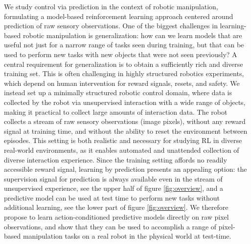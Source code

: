 We study control via prediction in the context of robotic manipulation, formulating a model-based reinforcement learning approach centered around prediction of raw sensory observations. One of the biggest challenges in learning-based robotic manipulation is generalization: how can we learn models that are useful not just for a narrow range of tasks seen during training, but that can be used to perform new tasks with new objects that were not seen previously?
A central requirement for generalization is to obtain a sufficiently rich and diverse training set. This is often challenging in highly structured robotics experiments, which depend on human intervention for reward signals, resets, and safety. We instead set up a minimally structured robotic control domain, where data is collected by the robot via unsupervised interaction with a wide range of objects, making it practical to collect large amounts of interaction data. The robot collects a stream of raw sensory observations (image pixels), without any reward signal at training time, and without the ability to reset the environment between episodes. This setting is both realistic and necessary for studying RL in diverse real-world environments, as it enables automated and unattended collection of diverse interaction experience. Since the training setting affords no readily accessible reward signal, learning by prediction presents an appealing option: the supervision signal for prediction is always available even in the stream of unsupervised experience, see the upper half of figure \ref{fig:overview}, and a predictive model can be used at test time to perform new tasks without additional learning, see the lower part of figure \ref{fig:overview}.
We therefore propose to learn action-conditioned predictive models directly on raw pixel observations, and show that they can be used to accomplish a range of pixel-based manipulation tasks on a real robot in the physical world at test-time.

